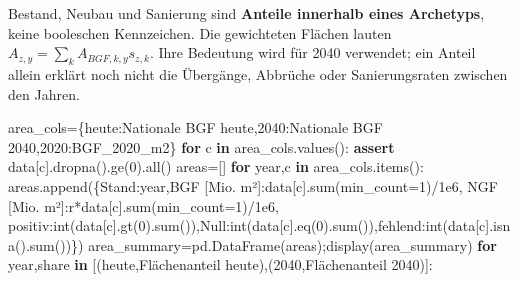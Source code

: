\documentclass[
  ngerman,
  a4paper,
  DIV=11]{scrreprt}
\newenvironment{Shaded}{\begin{snugshade}}{\end{snugshade}}
\newcommand{\BuiltInTok}[1]{\textcolor[rgb]{0.00,0.23,0.31}{#1}}
\newcommand{\ControlFlowTok}[1]{\textcolor[rgb]{0.00,0.23,0.31}{\textbf{#1}}}
\newcommand{\DecValTok}[1]{\textcolor[rgb]{0.68,0.00,0.00}{#1}}
\newcommand{\FloatTok}[1]{\textcolor[rgb]{0.68,0.00,0.00}{#1}}
\newcommand{\KeywordTok}[1]{\textcolor[rgb]{0.00,0.23,0.31}{\textbf{#1}}}
\newcommand{\NormalTok}[1]{\textcolor[rgb]{0.00,0.23,0.31}{#1}}
\newcommand{\OperatorTok}[1]{\textcolor[rgb]{0.37,0.37,0.37}{#1}}
\newcommand{\StringTok}[1]{\textcolor[rgb]{0.13,0.47,0.30}{#1}}
\begin{document}
Bestand, Neubau und Sanierung sind \textbf{Anteile innerhalb eines
Archetyps}, keine booleschen Kennzeichen. Die gewichteten Flächen lauten
\(A_{z,y}=\sum_k A_{BGF,k,y}s_{z,k}\). Ihre Bedeutung wird für 2040
verwendet; ein Anteil allein erklärt noch nicht die Übergänge, Abbrüche
oder Sanierungsraten zwischen den Jahren.

\begin{Shaded}
\begin{Highlighting}[]
\NormalTok{area\_cols}\OperatorTok{=}\NormalTok{\{}\StringTok{\textquotesingle{}heute\textquotesingle{}}\NormalTok{:}\StringTok{\textquotesingle{}Nationale BGF heute\textquotesingle{}}\NormalTok{,}\StringTok{\textquotesingle{}2040\textquotesingle{}}\NormalTok{:}\StringTok{\textquotesingle{}Nationale BGF 2040\textquotesingle{}}\NormalTok{,}\StringTok{\textquotesingle{}2020\textquotesingle{}}\NormalTok{:}\StringTok{\textquotesingle{}BGF\_2020\_m2\textquotesingle{}}\NormalTok{\}}
\ControlFlowTok{for}\NormalTok{ c }\KeywordTok{in}\NormalTok{ area\_cols.values():}
    \ControlFlowTok{assert}\NormalTok{ data[c].dropna().ge(}\DecValTok{0}\NormalTok{).}\BuiltInTok{all}\NormalTok{()}
\NormalTok{areas}\OperatorTok{=}\NormalTok{[]}
\ControlFlowTok{for}\NormalTok{ year,c }\KeywordTok{in}\NormalTok{ area\_cols.items():}
\NormalTok{    areas.append(\{}\StringTok{\textquotesingle{}Stand\textquotesingle{}}\NormalTok{:year,}\StringTok{\textquotesingle{}BGF [Mio. m²]\textquotesingle{}}\NormalTok{:data[c].}\BuiltInTok{sum}\NormalTok{(min\_count}\OperatorTok{=}\DecValTok{1}\NormalTok{)}\OperatorTok{/}\FloatTok{1e6}\NormalTok{,}
                  \StringTok{\textquotesingle{}NGF [Mio. m²]\textquotesingle{}}\NormalTok{:r}\OperatorTok{*}\NormalTok{data[c].}\BuiltInTok{sum}\NormalTok{(min\_count}\OperatorTok{=}\DecValTok{1}\NormalTok{)}\OperatorTok{/}\FloatTok{1e6}\NormalTok{,}
                  \StringTok{\textquotesingle{}positiv\textquotesingle{}}\NormalTok{:}\BuiltInTok{int}\NormalTok{(data[c].gt(}\DecValTok{0}\NormalTok{).}\BuiltInTok{sum}\NormalTok{()),}\StringTok{\textquotesingle{}Null\textquotesingle{}}\NormalTok{:}\BuiltInTok{int}\NormalTok{(data[c].eq(}\DecValTok{0}\NormalTok{).}\BuiltInTok{sum}\NormalTok{()),}\StringTok{\textquotesingle{}fehlend\textquotesingle{}}\NormalTok{:}\BuiltInTok{int}\NormalTok{(data[c].isna().}\BuiltInTok{sum}\NormalTok{())\})}
\NormalTok{area\_summary}\OperatorTok{=}\NormalTok{pd.DataFrame(areas)}\OperatorTok{;}\NormalTok{display(area\_summary)}
\ControlFlowTok{for}\NormalTok{ year,share }\KeywordTok{in}\NormalTok{ [(}\StringTok{\textquotesingle{}heute\textquotesingle{}}\NormalTok{,}\StringTok{\textquotesingle{}Flächenanteil heute\textquotesingle{}}\NormalTok{),(}\StringTok{\textquotesingle{}2040\textquotesingle{}}\NormalTok{,}\StringTok{\textquotesingle{}Flächenanteil 2040\textquotesingle{}}\NormalTok{)]:}

\end{Highlighting}
\end{Shaded}
\end{document}
